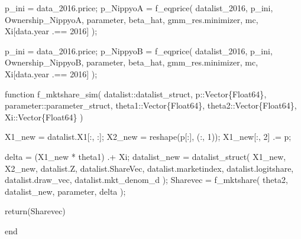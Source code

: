 \documentclass[
  letterpaper,
  DIV=11,
  numbers=noendperiod]{scrreprt}
\newenvironment{Shaded}{\begin{snugshade}}{\end{snugshade}}
\newcommand{\ControlFlowTok}[1]{\textcolor[rgb]{0.00,0.23,0.31}{#1}}
\newcommand{\DataTypeTok}[1]{\textcolor[rgb]{0.68,0.00,0.00}{#1}}
\newcommand{\FloatTok}[1]{\textcolor[rgb]{0.68,0.00,0.00}{#1}}
\newcommand{\FunctionTok}[1]{\textcolor[rgb]{0.28,0.35,0.67}{#1}}
\newcommand{\KeywordTok}[1]{\textcolor[rgb]{0.00,0.23,0.31}{#1}}
\newcommand{\NormalTok}[1]{\textcolor[rgb]{0.00,0.23,0.31}{#1}}
\newcommand{\OperatorTok}[1]{\textcolor[rgb]{0.37,0.37,0.37}{#1}}
\begin{document}
\begin{Shaded}
\begin{Highlighting}[]
\NormalTok{p\_ini }\OperatorTok{=}\NormalTok{ data\_2016.price;}
\NormalTok{p\_NippyoA }\OperatorTok{=} \FunctionTok{f\_eqprice}\NormalTok{(}
\NormalTok{    datalist\_2016,}
\NormalTok{    p\_ini,}
\NormalTok{    Ownership\_NippyoA,}
\NormalTok{    parameter,}
\NormalTok{    beta\_hat,}
\NormalTok{    gmm\_res.minimizer,}
\NormalTok{    mc,}
\NormalTok{    Xi[data.year }\OperatorTok{.==} \FloatTok{2016}\NormalTok{]}
\NormalTok{);}

\NormalTok{p\_ini }\OperatorTok{=}\NormalTok{ data\_2016.price;}
\NormalTok{p\_NippyoB }\OperatorTok{=} \FunctionTok{f\_eqprice}\NormalTok{(}
\NormalTok{    datalist\_2016,}
\NormalTok{    p\_ini,}
\NormalTok{    Ownership\_NippyoB,}
\NormalTok{    parameter,}
\NormalTok{    beta\_hat,}
\NormalTok{    gmm\_res.minimizer,}
\NormalTok{    mc,}
\NormalTok{    Xi[data.year }\OperatorTok{.==} \FloatTok{2016}\NormalTok{]}
\NormalTok{);}
\end{Highlighting}
\end{Shaded}

\begin{Shaded}
\begin{Highlighting}[]
\KeywordTok{function} \FunctionTok{f\_mktshare\_sim}\NormalTok{(}
\NormalTok{        datalist}\OperatorTok{::}\DataTypeTok{datalist\_struct}\NormalTok{,}
\NormalTok{        p}\OperatorTok{::}\DataTypeTok{Vector\{Float64\}}\NormalTok{,}
\NormalTok{        parameter}\OperatorTok{::}\DataTypeTok{parameter\_struct}\NormalTok{,}
\NormalTok{        theta1}\OperatorTok{::}\DataTypeTok{Vector\{Float64\}}\NormalTok{,}
\NormalTok{        theta2}\OperatorTok{::}\DataTypeTok{Vector\{Float64\}}\NormalTok{,}
\NormalTok{        Xi}\OperatorTok{::}\DataTypeTok{Vector\{Float64\}}
\NormalTok{    )}
    
\NormalTok{    X1\_new }\OperatorTok{=}\NormalTok{ datalist.X1[}\OperatorTok{:}\NormalTok{, }\OperatorTok{:}\NormalTok{];}
\NormalTok{    X2\_new }\OperatorTok{=} \FunctionTok{reshape}\NormalTok{(p[}\OperatorTok{:}\NormalTok{], (}\OperatorTok{:}\NormalTok{, }\FloatTok{1}\NormalTok{));}
\NormalTok{    X1\_new[}\OperatorTok{:}\NormalTok{, }\FloatTok{2}\NormalTok{] }\OperatorTok{.=}\NormalTok{ p;}
    
\NormalTok{    delta }\OperatorTok{=}\NormalTok{ (X1\_new }\OperatorTok{*}\NormalTok{ theta1) }\OperatorTok{.+}\NormalTok{ Xi;}
\NormalTok{    datalist\_new }\OperatorTok{=} \FunctionTok{datalist\_struct}\NormalTok{(}
\NormalTok{        X1\_new, X2\_new, datalist.Z, datalist.ShareVec, datalist.marketindex, }
\NormalTok{        datalist.logitshare, datalist.draw\_vec, datalist.mkt\_denom\_d}
\NormalTok{        );}
\NormalTok{    Sharevec }\OperatorTok{=} \FunctionTok{f\_mktshare}\NormalTok{(}
\NormalTok{        theta2, datalist\_new, parameter, delta}
\NormalTok{    );}
    
    \ControlFlowTok{return}\NormalTok{(Sharevec)}
    
\KeywordTok{end}
\end{Highlighting}
\end{Shaded}
\end{document}
